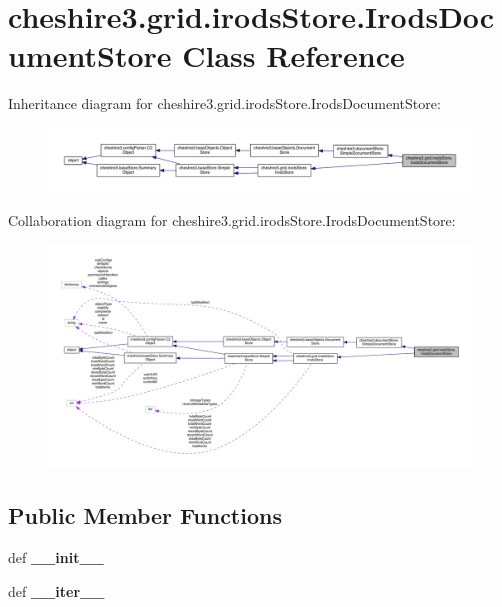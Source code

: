 \hypertarget{classcheshire3_1_1grid_1_1irods_store_1_1_irods_document_store}{\section{cheshire3.\-grid.\-irods\-Store.\-Irods\-Document\-Store Class Reference}
\label{classcheshire3_1_1grid_1_1irods_store_1_1_irods_document_store}
}


Inheritance diagram for cheshire3.\-grid.\-irods\-Store.\-Irods\-Document\-Store\-:
\nopagebreak
\begin{figure}[H]
\begin{center}
\leavevmode
\includegraphics[width=350pt]{classcheshire3_1_1grid_1_1irods_store_1_1_irods_document_store__inherit__graph}
\end{center}
\end{figure}


Collaboration diagram for cheshire3.\-grid.\-irods\-Store.\-Irods\-Document\-Store\-:
\nopagebreak
\begin{figure}[H]
\begin{center}
\leavevmode
\includegraphics[width=350pt]{classcheshire3_1_1grid_1_1irods_store_1_1_irods_document_store__coll__graph}
\end{center}
\end{figure}
\subsection*{Public Member Functions}
\begin{DoxyCompactItemize}
\item 
\hypertarget{classcheshire3_1_1grid_1_1irods_store_1_1_irods_document_store_a5380817c42c39094da50fa35dc96a54e}{def {\bfseries \-\_\-\-\_\-init\-\_\-\-\_\-}}\label{classcheshire3_1_1grid_1_1irods_store_1_1_irods_document_store_a5380817c42c39094da50fa35dc96a54e}

\item 
\hypertarget{classcheshire3_1_1grid_1_1irods_store_1_1_irods_document_store_a13aac63db8fba81ff70d06cc24b09afe}{def {\bfseries \-\_\-\-\_\-iter\-\_\-\-\_\-}}\label{classcheshire3_1_1grid_1_1irods_store_1_1_irods_document_store_a13aac63db8fba81ff70d06cc24b09afe}

\end{DoxyCompactItemize}
